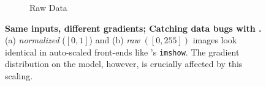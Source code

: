 \begin{figure}
\begin{subfigure}[t]{0.46\textwidth}
\begin{minipage}{.49\textwidth}
		\end{minipage}
		\begin{minipage}{.49\textwidth}
			\centering
			\vspace{1.4\baselineskip}
			
		\end{minipage}
		\caption{Raw Data}
		\label{fig:data-pre-processing_raw}
	\end{subfigure}
	\caption{\textbf{Same inputs, different gradients; Catching data 
	    bugs with \cockpittitle.} (a) \emph{normalized} ($[0, 1]$) and (b)
    	\emph{raw} $([0, 255])$ images look identical in auto-scaled
	    front-ends like \matplotlib's \texttt{imshow}. The gradient distribution on
	    the \threecthreed model, however, is crucially affected by this
	    scaling.}
	\label{fig:data-pre-processing}
\end{figure}

